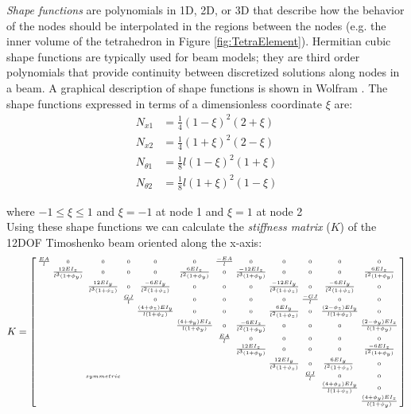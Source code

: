 {\textit{Shape functions} are polynomials in 1D, 2D, or 3D that describe how the behavior of the nodes should be interpolated in the regions between the nodes (e.g. the inner volume of the tetrahedron in Figure \ref{fig:TetraElement}).  Hermitian cubic shape functions are typically used for beam models; they are third order polynomials that provide continuity between discretized solutions along nodes in a beam.  A graphical description of shape functions is shown in Wolfram \cite{Wolfram2016}.  The shape functions expressed in terms of a dimensionless coordinate $\xi$ are:
\begin{align*} 
N_{x1} &= \textstyle\frac{1}{4}(1-\xi)^2(2+\xi)\\
N_{x2} &= \textstyle\frac{1}{4}(1+\xi)^2(2-\xi)\\
N_{\theta1} &= \textstyle\frac{1}{8}l(1-\xi)^2(1+\xi)\\
N_{\theta2} &= \textstyle\frac{1}{8}l(1+\xi)^2(1-\xi)
\end{align*}

where $-1 \leq \xi \leq 1$ and $\xi = -1$ at node 1 and $\xi = 1$ at node 2\\

Using these shape functions we can calculate the \textit{stiffness matrix} ($K$) of the 12DOF Timoshenko beam oriented along the x-axis:\\

\[ K =  \scriptsize {\left[ \begin{smallmatrix}
\tfrac{EA}{l} & 0 & 0 & 0 & 0 & 0 & \tfrac{-EA}{l} & 0 & 0 & 0 & 0 & 0\\
 & \tfrac{12EI_z}{l^3(1+\phi_y)} & 0 & 0 & 0 & \tfrac{6EI_z}{l^2(1+\phi_y)} & 0 & \tfrac{-12EI_z}{l^3(1+\phi_y)} & 0 & 0 & 0 & \tfrac{6EI_z}{l^2(1+\phi_y)}\\
 &  & \tfrac{12EI_y}{l^3(1+\phi_z)} & 0 & \tfrac{-6EI_y}{l^2(1+\phi_z)} & 0 & 0 & 0 & \tfrac{-12EI_y}{l^3(1+\phi_z)} & 0 & \tfrac{-6EI_y}{l^2(1+\phi_z)} & 0\\
 &  &  &  \tfrac{GJ}{l} &  0 &  0 &  0 &  0 &  0 & \tfrac{-GJ}{l} & 0 & 0\\
 &  &  &  & \tfrac{(4+\phi_z)EI_y}{l(1+\phi_z)} & 0 & 0 & 0 & \tfrac{6EI_y}{l^2(1+\phi_z)} & 0 & \tfrac{(2-\phi_z)EI_y}{l(1+\phi_z)} & 0\\
 &  &  &  &  & \tfrac{(4+\phi_y)EI_z}{l(1+\phi_y)} & 0 & \tfrac{-6EI_z}{l^2(1+\phi_y)} & 0 & 0 & 0 & \tfrac{(2-\phi_y)EI_z}{l(1+\phi_y)}\\
 &  &  &  &  &  & \tfrac{EA}{l}  & 0 & 0 & 0 & 0 & 0\\
 &  &  &  &  &  &  & \tfrac{12EI_z}{l^3(1+\phi_y)} & 0 & 0 & 0 & \tfrac{-6EI_z}{l^2(1+\phi_y)}\\
 &  &  &  &  &  &  &  & \tfrac{12EI_y}{l^3(1+\phi_z)} & 0 & \tfrac{6EI_y}{l^2(1+\phi_z)}\ & 0\\
 &  & symmetric &  &  &  &  &  &  & \tfrac{GJ}{l} & 0 & 0\\
 &  &  &  &  &  &  &  &  &  & \tfrac{(4+\phi_z)EI_y}{l(1+\phi_z)} & 0\\
  &  &  &  &  &  &  &  &  &  &  & \tfrac{(4+\phi_y)EI_z}{l(1+\phi_y)}\\
 \end{smallmatrix} \right] }\]
 
}
